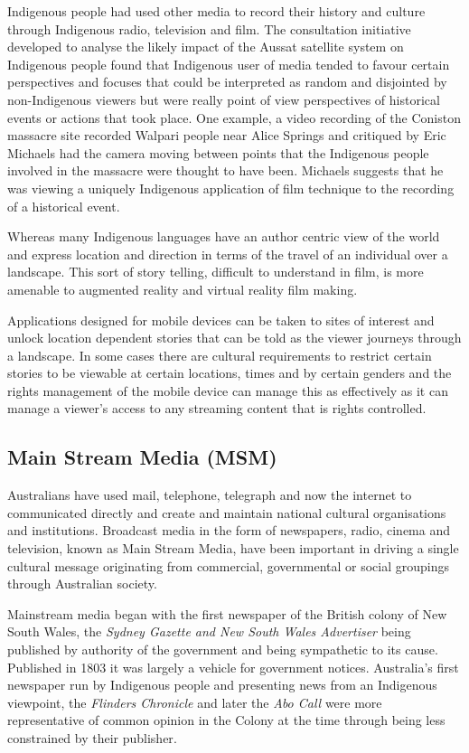 Indigenous people had used other media to record their history and culture through Indigenous radio, television and film. The consultation initiative developed to analyse the likely impact of the Aussat satellite system on Indigenous people found that Indigenous user of media tended to favour certain perspectives and focuses that could be interpreted as random and disjointed by non-Indigenous viewers but were really point of view perspectives of historical events or actions that took place. One example, a video recording of the Coniston massacre site recorded Walpari people near Alice Springs and critiqued by Eric Michaels \cite{RefWorks:12}
had the camera moving between points that the Indigenous people involved in the massacre were thought to have been. Michaels suggests that he was viewing a uniquely Indigenous application of film technique to the recording of a historical event\cite{RefWorks:25}.

 Whereas many Indigenous languages have an author centric view of the world and express location and direction in terms of the travel of an individual over a landscape. This sort of story telling, difficult to understand in film, is more amenable to augmented reality and virtual reality film making. 

Applications designed for mobile devices can be taken to sites of interest and unlock location dependent stories that can be told as the viewer journeys through a landscape. In some cases there are cultural requirements to restrict certain stories to be viewable at certain locations, times and by certain genders and the rights management of the mobile device can manage this as effectively as it can manage a viewer's access to any streaming content that is rights controlled.

\subsection{Main Stream Media (MSM)}

Australians have used mail, telephone, telegraph and now the internet to communicated directly and create and maintain national cultural organisations and institutions. Broadcast media in the form of newspapers, radio, cinema and television, known as Main Stream Media, have been important in driving a single cultural message originating from commercial, governmental or social groupings through Australian society. 

Mainstream media began with the first newspaper of the British colony of New South Wales, the \emph{Sydney Gazette and New South Wales Advertiser} being published by authority of the government and being sympathetic to its cause\cite{RefWorks:427}. Published in 1803 it was largely a vehicle for government notices. Australia's first newspaper run by Indigenous people and presenting news from an Indigenous viewpoint, the \emph{Flinders Chronicle} and later the \emph{Abo Call} were more representative of common opinion in the Colony at the time through being less constrained by their publisher\cite[p4]{RefWorks:427}.

